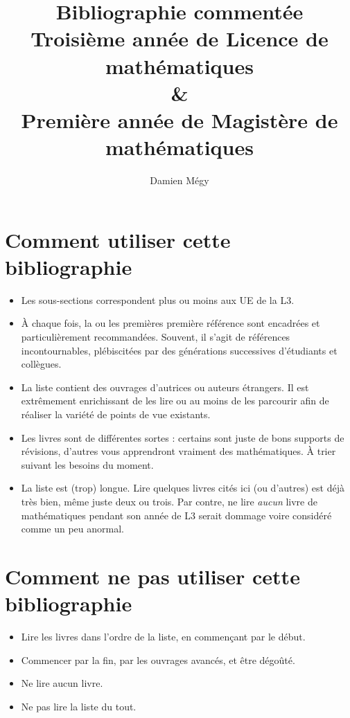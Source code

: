 \documentclass{article}
\begin{document}
\author{Damien Mégy}
\title{Bibliographie commentée\\Troisième année de Licence de mathématiques \\ \&\\ Première année de Magistère de mathématiques}

\maketitle
\tableofcontents

\section*{Comment utiliser cette bibliographie}
\begin{itemize}
\item Les sous-sections correspondent plus ou moins aux UE de la L3.
\item À chaque fois, la ou les premières première référence sont encadrées et  particulièrement recommandées. Souvent, il s'agit de références incontournables, plébiscitées par des générations successives d'étudiants et collègues. 
\item La liste contient des ouvrages d'autrices ou auteurs étrangers. Il est  extrêmement enrichissant de les lire ou au moins de les parcourir afin de réaliser la variété de points de vue existants.
\item Les livres sont de différentes sortes : certains sont juste de bons supports de révisions, d'autres vous apprendront vraiment des mathématiques. À trier suivant les besoins du moment.
\item La liste est (trop) longue. Lire quelques livres cités ici (ou d'autres) est déjà très bien, même juste deux ou trois. Par contre, ne lire \emph{aucun} livre de mathématiques pendant son année de L3 serait dommage voire considéré comme un peu anormal. 
\end{itemize}

\section*{Comment ne pas utiliser cette bibliographie}
\begin{itemize}
\item Lire les livres dans l'ordre de la liste, en commençant par le début.
\item Commencer par la fin, par les ouvrages avancés, et être dégoûté.
\item Ne lire aucun livre.
\item Ne pas lire la liste du tout.
\end{itemize}
\end{document}
